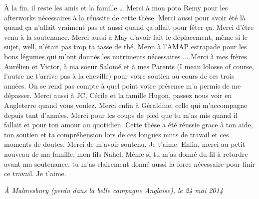 \`A la fin, il reste les amis et la famille \ldots{}
Merci à mon poto Remy pour les afterworks nécessaires
à la réussite de cette thèse. Merci aussi pour avoir été
là quand ça n'allait vraiment pas et aussi quand ça
allait pour fêter ça. Merci d'être venu à la soutenance.
Merci aussi à May d'avoir fait le déplacement, même
si le sujet, well, n'était pas trop ta tasse de thé.
Merci à l'AMAP estrapade pour les bons légumes qui m'ont donnés
les nutriments nécessaires ...
Merci à mes frères Aurélien et Victor, à ma soeur Salomé et à mes
Parents (I mean lolosse of course, l'autre ne t'arrive pas
à la cheville) pour votre soutien au cours de ces trois années.
On se rend pas compte à quel point votre présence m'a permis de
me dépasser. Merci aussi à JC, Cécile et la famille Hugon, passez 
nous voir en Angleterre quand vous voulez. Merci enfin à Géraldine, celle qui 
m'accompagne depuis tant d'années. Merci pour les coups
de pied que tu m'as mis quand il fallait et pour ton
amour au quotidien. Cette thèse a été réussie grace à ton aide,
ton soutien et ta compréhension lors de ces longues nuits 
de travail et ces moments de doutes. Merci de m’avoir soutenu. Je t'aime.
Enfin, merci au petit nouveau de ma famille, mon fils Nahel.
Même si tu m'as donné du fil à retordre avant ma soutenance,
tu m'as clairement donné aussi la force nécessaire
pour finir ce travail. Je t'aime.

\begin{flushright}
\emph{\`A Malmesbury (perdu dans la belle campagne Anglaise), le 24 mai 2014}
\end{flushright}
